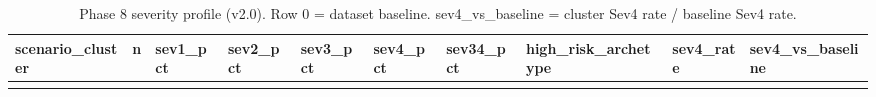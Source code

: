 \documentclass[
]{article}
\begin{document}
\begin{longtable}[]{@{}
  >{\raggedleft\arraybackslash}p{}
  >{\raggedleft\arraybackslash}p{}
  >{\raggedleft\arraybackslash}p{}
  >{\raggedleft\arraybackslash}p{}
  >{\raggedleft\arraybackslash}p{}
  >{\raggedleft\arraybackslash}p{}
  >{\raggedleft\arraybackslash}p{}
  >{\raggedright\arraybackslash}p{}
  >{\raggedleft\arraybackslash}p{}
  >{\raggedleft\arraybackslash}p{}@{}}
\caption{Phase 8 severity profile (v2.0). Row 0 = dataset baseline.
sev4\_vs\_baseline = cluster Sev4 rate / baseline Sev4
rate.}\tabularnewline
\toprule\noalign{}
\begin{minipage}[b]{\linewidth}\raggedleft
scenario\_cluster
\end{minipage} & \begin{minipage}[b]{\linewidth}\raggedleft
n
\end{minipage} & \begin{minipage}[b]{\linewidth}\raggedleft
sev1\_pct
\end{minipage} & \begin{minipage}[b]{\linewidth}\raggedleft
sev2\_pct
\end{minipage} & \begin{minipage}[b]{\linewidth}\raggedleft
sev3\_pct
\end{minipage} & \begin{minipage}[b]{\linewidth}\raggedleft
sev4\_pct
\end{minipage} & \begin{minipage}[b]{\linewidth}\raggedleft
sev34\_pct
\end{minipage} & \begin{minipage}[b]{\linewidth}\raggedright
high\_risk\_archetype
\end{minipage} & \begin{minipage}[b]{\linewidth}\raggedleft
sev4\_rate
\end{minipage} & \begin{minipage}[b]{\linewidth}\raggedleft
sev4\_vs\_baseline
\end{minipage} \\
\midrule\noalign{}
\endfirsthead

\end{longtable}
\end{document}
